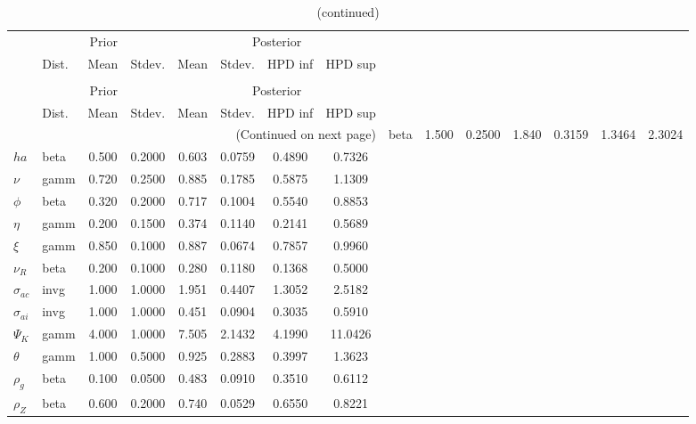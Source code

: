  
\begin{center}
\begin{longtable}{llcccccc} 
\caption{Results from Metropolis-Hastings (parameters)}
 \label{Table:MHPosterior:1}\\
\toprule 
  & \multicolumn{3}{c}{Prior}  &  \multicolumn{4}{c}{Posterior} \\
  \cmidrule(r{.75em}){2-4} \cmidrule(r{.75em}){5-8}
  & Dist. & Mean  & Stdev. & Mean & Stdev. & HPD inf & HPD sup\\
\midrule \endfirsthead 
\caption{(continued)}\\\toprule 
  & \multicolumn{3}{c}{Prior}  &  \multicolumn{4}{c}{Posterior} \\
  \cmidrule(r{.75em}){2-4} \cmidrule(r{.75em}){5-8}
  & Dist. & Mean  & Stdev. & Mean & Stdev. & HPD inf & HPD sup\\
\midrule \endhead 
\bottomrule \multicolumn{8}{r}{(Continued on next page)} \endfoot 
\bottomrule \endlastfoot 
${\sigma}$ & beta &   1.500 & 0.2500 &   1.840& 0.3159 &  1.3464 &  2.3024 \\ 
${ha}$ & beta &   0.500 & 0.2000 &   0.603& 0.0759 &  0.4890 &  0.7326 \\ 
$\nu$ & gamm &   0.720 & 0.2500 &   0.885& 0.1785 &  0.5875 &  1.1309 \\ 
${\phi}$ & beta &   0.320 & 0.2000 &   0.717& 0.1004 &  0.5540 &  0.8853 \\ 
${\eta}$ & gamm &   0.200 & 0.1500 &   0.374& 0.1140 &  0.2141 &  0.5689 \\ 
$\xi$ & gamm &   0.850 & 0.1000 &   0.887& 0.0674 &  0.7857 &  0.9960 \\ 
${\nu_R}$ & beta &   0.200 & 0.1000 &   0.280& 0.1180 &  0.1368 &  0.5000 \\ 
${\sigma_{ac}}$ & invg &   1.000 & 1.0000 &   1.951& 0.4407 &  1.3052 &  2.5182 \\ 
${\sigma_{ai}}$ & invg &   1.000 & 1.0000 &   0.451& 0.0904 &  0.3035 &  0.5910 \\ 
${\Psi_{K}}$ & gamm &   4.000 & 1.0000 &   7.505& 2.1432 &  4.1990 & 11.0426 \\ 
${\theta}$ & gamm &   1.000 & 0.5000 &   0.925& 0.2883 &  0.3997 &  1.3623 \\ 
${\rho_g}$ & beta &   0.100 & 0.0500 &   0.483& 0.0910 &  0.3510 &  0.6112 \\ 
${\rho_Z}$ & beta &   0.600 & 0.2000 &   0.740& 0.0529 &  0.6550 &  0.8221 \\ 

\end{longtable}
\end{center}
